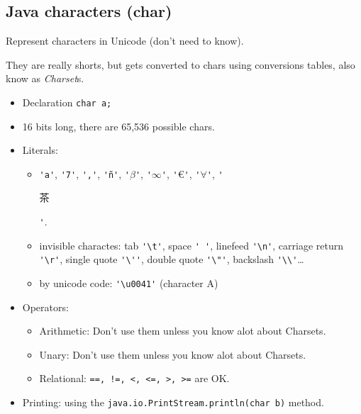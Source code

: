\documentclass[8pt, a4paper, oneside]{extarticle}
\begin{document}
\subsection{Java characters (char)}

Represent characters in Unicode (don't need to know).

They are really shorts, but gets converted to chars using conversions tables,
also know as \emph{Charset}s.

\begin{itemize}

  \item Declaration \verb+char a;+

  \item 16 bits long, there are 65,536 possible chars.

  \item Literals:

    \begin{itemize}

      \item \verb+'a'+, \verb+'7'+, \verb+','+, \verb+'ñ'+, \verb+'+$\beta$\verb+'+,
        \verb+'+$\infty$\verb+'+, \verb+'+\euro\verb+'+,
      \verb+'+$\forall$\verb+'+, \verb+'+\begin{CJK*}{UTF8}{min}茶\end{CJK*}\verb+'+.

      \item invisible charactes: tab \verb+'\t'+, space \verb+' '+, linefeed
        \verb+'\n'+, carriage return \verb+'\r'+, single quote \verb+'\''+,
        double quote \verb+'\"'+, backslash \verb+'\\'+\ldots

      \item by unicode code: \verb+'\u0041'+ (character A)

    \end{itemize}

  \item Operators: 

    \begin{itemize}

      \item Arithmetic: Don't use them unless you know alot about Charsets.

      \item Unary: Don't use them unless you know alot about Charsets.

      \item Relational: \verb^==, !=, <, <=, >, >=^ are OK.

    \end{itemize}

  \item Printing: using the \verb+java.io.PrintStream.println(char b)+ method.

\end{itemize}
\end{document}
